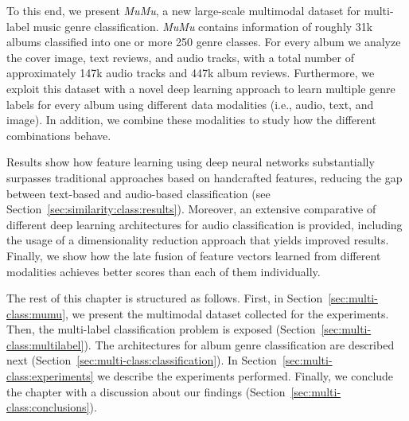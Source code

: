 

To this end, we present \emph{MuMu}, a new large-scale multimodal dataset for multi-label music genre classification. \emph{MuMu} contains information of roughly 31k albums classified into one or more 250 genre classes. For every album we analyze the cover image, text reviews, and audio tracks, with a total number of approximately 147k audio tracks and 447k album reviews. 
Furthermore, we exploit this dataset with a novel deep learning approach to learn multiple genre labels for every album using different data modalities (i.e., audio, text, and image). 
In addition, we combine these modalities to study how the different combinations behave.

Results show how feature learning using deep neural networks substantially surpasses traditional approaches based on handcrafted features, reducing the gap between text-based and audio-based classification (see Section~\ref{sec:similarity:class:results}).
Moreover, an extensive comparative of different deep learning architectures for audio classification is provided, including the usage of a dimensionality reduction approach that yields improved results. 
Finally, we show how the late fusion of feature vectors learned from different modalities achieves better scores than each of them individually.

The rest of this chapter is structured as follows. First, in Section~\ref{sec:multi-class:mumu}, we present the multimodal dataset collected for the experiments. Then, the multi-label classification problem is exposed (Section~\ref{sec:multi-class:multilabel}). The architectures for album genre classification are described next (Section~\ref{sec:multi-class:classification}). In Section~\ref{sec:multi-class:experiments} we describe the experiments performed. Finally, we conclude the chapter with a discussion about our findings (Section~\ref{sec:multi-class:conclusions}).

